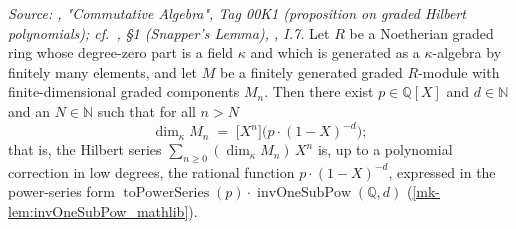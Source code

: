 \begin{lemma}\label{mk-lem:gradedHilbertSerre_rational}
  \leanok

  \textit{Source: \cite{stacks-project}, "Commutative Algebra", Tag 00K1
  (proposition on graded Hilbert polynomials); cf.\ \cite{nitsure-hilbert-quot}, \S 1 (Snapper's
  Lemma), \cite{hartshorne-ag}, I.7.}
  Let \(R\) be a Noetherian graded ring whose degree-zero part is a field
  \(\kappa\) and which is generated as a \(\kappa\)-algebra by finitely many
  elements, and let \(M\) be a finitely generated graded \(R\)-module with
  finite-dimensional graded components \(M_n\). Then there exist
  \(p \in \mathbb{Q}[X]\) and \(d \in \mathbb{N}\) and an \(N \in \mathbb{N}\)
  such that for all \(n > N\)
  \[
    \dim_{\kappa} M_n \;=\; \bigl[ X^n \bigr]\bigl( p \cdot (1 - X)^{-d}\bigr);
  \]
  that is, the Hilbert series \(\sum_{n \ge 0} (\dim_\kappa M_n)\, X^n\) is, up to
  a polynomial correction in low degrees, the rational function
  \(p \cdot (1 - X)^{-d}\), expressed in the power-series form
  \(\operatorname{toPowerSeries}(p) \cdot \operatorname{invOneSubPow}(\mathbb{Q}, d)\)
  (\ref{mk-lem:invOneSubPow_mathlib}).

\end{lemma}

